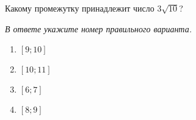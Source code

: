 Какому промежутку принадлежит число $3\sqrt{10}$?

\textit{В ответе укажите номер правильного варианта.}
\begin{multicols}{4}
	\begin{enumerate}[label=\arabic*)]
		\item $[9;10]$
		\item $[10;11]$
		\item $[6;7]$
		\item $[8;9]$
	\end{enumerate}
\end{multicols}